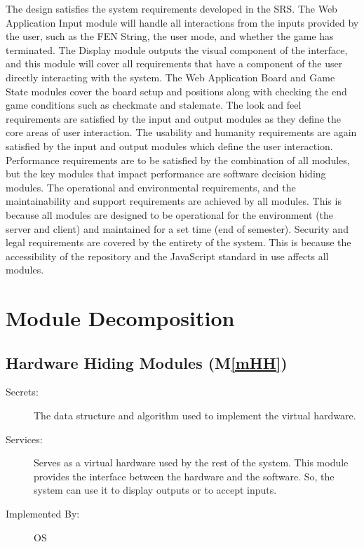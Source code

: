 \documentclass[12pt, titlepage]{article}
\newcommand{\mref}[1]{M\ref{#1}}
\begin{document}
The design satisfies the system requirements developed in the SRS. The Web Application 
Input module will handle all interactions from the inputs provided by the user, such as the 
FEN String, the user mode, and whether the game has terminated. The Display module outputs 
the visual component of the interface, and this module will cover all requirements that have a 
component of the user directly interacting with the system. The Web Application Board and Game 
State modules cover the board setup and positions along with checking the end game conditions 
such as checkmate and stalemate. The look and feel requirements are satisfied by the input and 
output modules as they define the core areas of user interaction. The usability and humanity 
requirements are again satisfied by the input and output modules which define the user interaction. 
Performance requirements are to be satisfied by the combination of all modules, but the key modules 
that impact performance are software decision hiding modules. The operational and environmental 
requirements, and the maintainability and support requirements are achieved by all modules. This 
is because all modules are designed to be operational for the environment (the server and client) 
and maintained for a set time (end of semester). Security and legal requirements are covered by 
the entirety of the system. This is because the accessibility of the repository and the JavaScript 
standard in use affects all modules.

\section{Module Decomposition} \label{SecMD}

\subsection{Hardware Hiding Modules (\mref{mHH})}

\begin{description}
\item[Secrets:]The data structure and algorithm used to implement the virtual
  hardware.
\item[Services:]Serves as a virtual hardware used by the rest of the
  system. This module provides the interface between the hardware and the
  software. So, the system can use it to display outputs or to accept inputs.
\item[Implemented By:] OS
\end{description}
\end{document}
